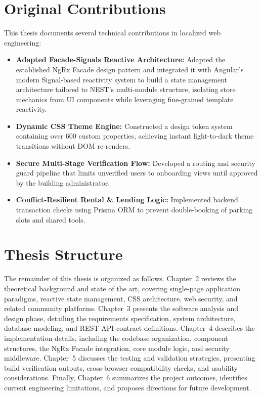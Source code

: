 \section{Original Contributions}
This thesis documents several technical contributions in localized web engineering:
\begin{itemize}
    \item \textbf{Adapted Facade-Signals Reactive Architecture:} Adapted the established NgRx Facade design pattern and integrated it with Angular's modern Signal-based reactivity system to build a state management architecture tailored to NEST's multi-module structure, isolating store mechanics from UI components while leveraging fine-grained template reactivity.
    \item \textbf{Dynamic CSS Theme Engine:} Constructed a design token system containing over 600 custom properties, achieving instant light-to-dark theme transitions without DOM re-renders.
    \item \textbf{Secure Multi-Stage Verification Flow:} Developed a routing and security guard pipeline that limits unverified users to onboarding views until approved by the building administrator.
    \item \textbf{Conflict-Resilient Rental \& Lending Logic:} Implemented backend transaction checks using Prisma ORM to prevent double-booking of parking slots and shared tools.
\end{itemize}

\section{Thesis Structure}
The remainder of this thesis is organized as follows. Chapter~2 reviews the theoretical background and state of the art, covering single-page application paradigms, reactive state management, CSS architecture, web security, and related community platforms. Chapter~3 presents the software analysis and design phase, detailing the requirements specification, system architecture, database modeling, and REST API contract definitions. Chapter~4 describes the implementation details, including the codebase organization, component structures, the NgRx Facade integration, core module logic, and security middleware. Chapter~5 discusses the testing and validation strategies, presenting build verification outputs, cross-browser compatibility checks, and usability considerations. Finally, Chapter~6 summarizes the project outcomes, identifies current engineering limitations, and proposes directions for future development.

